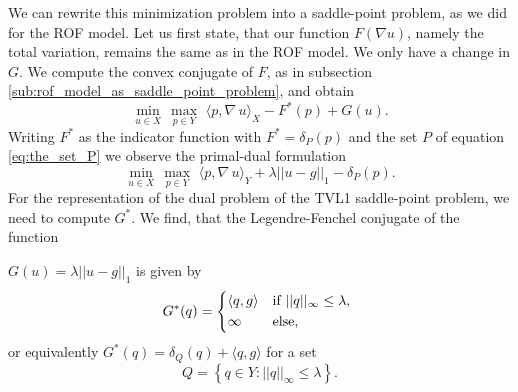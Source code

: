 \documentclass{scrreprt}
\begin{document}
            We can rewrite this minimization problem into a saddle-point problem, as we did for the ROF model. Let us first state, that our function $F(\nabla u)$, namely the total variation, remains the same as in the ROF model. We only have a change in $G$. We compute the convex conjugate of $F$, as in subsection \ref{sub:rof_model_as_saddle_point_problem}, and obtain
                $$
                    \min_{u \in X}\, \max_{p \in Y}\,\, \langle p, \nabla \, u \rangle_{X} - F^{\ast}(p) + G(u).
                $$
            Writing $F^{\ast}$ as the indicator function with $F^{\ast} = \delta_{P}(p)$ and the set $P$ of equation \ref{eq:the_set_P} we observe the primal-dual formulation
                $$
                    \min_{u \in X}\, \max_{p \in Y}\,\, \langle p, \nabla\, u \rangle_{Y} + \lambda ||u - g||_{1} - \delta_{P}(p).
                $$
            For the representation of the dual problem of the TVL1 saddle-point problem, we need to compute $G^{\ast}$. We find, that the Legendre-Fenchel conjugate of the function 

            $G(u) = \lambda||u-g||_{1}$ is given by
                $$
                    G^{\ast}(q) =
                        \begin{dcases*}
                            \langle q, g \rangle & \textnormal{if $||q||_{\infty} \le \lambda$,} \\
                            \infty & \textnormal{else},
                        \end{dcases*}
                $$
            or equivalently $G^{\ast}(q) = \delta_{Q}(q) + \langle q, g \rangle$ for a set
                $$
                    Q = \left\{ q \in Y : ||q||_{\infty} \le \lambda \right\}.
                $$
\end{document}
